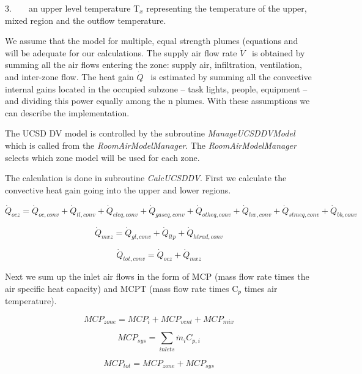 3.~~~~an upper level temperature T\(_{x}\) representing the temperature of the upper, mixed region and the outflow temperature.

We assume that the model for multiple, equal strength plumes (equations and will be adequate for our calculations. The supply air flow rate \(\dot V\) ~is obtained by summing all the air flows entering the zone: supply air, infiltration, ventilation, and inter-zone flow. The heat gain \(\dot Q\) ~is estimated by summing all the convective internal gains located in the occupied subzone -- task lights, people, equipment -- and dividing this power equally among the n plumes. With these assumptions we can describe the implementation.

The UCSD DV model is controlled by the subroutine \emph{ManageUCSDDVModel} which is called from the \emph{RoomAirModelManager}. The \emph{RoomAirModelManager} selects which zone model will be used for each zone.

The calculation is done in subroutine \emph{CalcUCSDDV}. First we calculate the convective heat gain going into the upper and lower regions.

\begin{equation}
\dot Q_{ocz} = \dot Q_{oc,conv} + \dot Q_{tl,conv} + \dot Q_{eleq,conv} + \dot Q_{gaseq,conv} + \dot Q_{otheq,conv} + \dot Q_{hw,conv} + \dot Q_{stmeq,conv} + \dot Q_{bb,conv}
\end{equation}

\begin{equation}
{\dot Q_{mxz}} = {\dot Q_{gl,conv}} + {\dot Q_{ltp}} + {\dot Q_{htrad,conv}}
\end{equation}

\begin{equation}
{\dot Q_{tot,conv}} = {\dot Q_{ocz}} + {\dot Q_{mxz}}
\end{equation}

Next we sum up the inlet air flows in the form of MCP (mass flow rate times the air specific heat capacity) and MCPT (mass flow rate times C\(_{p}\) times air temperature).

\begin{equation}
MC{P_{zone}} = MC{P_i} + MC{P_{vent}} + MC{P_{mix}}
\end{equation}

\begin{equation}
MC{P_{sys}} = \sum\limits_{inlets} {{{\dot m}_i}} {C_{p,i}}
\end{equation}

\begin{equation}
MC{P_{tot}} = MC{P_{zone}} + MC{P_{sys}}
\end{equation}

